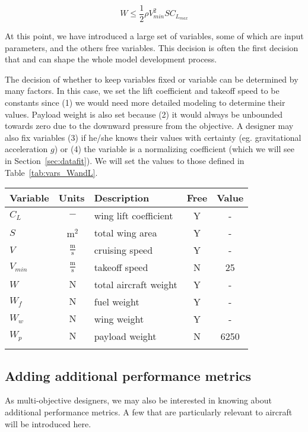 \begin{equation}
    W \leq \frac{1}{2} \rho V_{min}^2 S C_{L_{max}}
\end{equation}

At this point, we have introduced a large set of variables, some of which are input
parameters, and the others free variables. This decision is often the first decision
that
and can shape the whole model development process.

The decision of whether to keep variables fixed or variable can be determined by many
factors. In this case, we set the lift coefficient and takeoff speed to be constants since
(1) we would need
more detailed modeling to determine their values. Payload weight is also set
because (2) it would always be unbounded towards zero due to the downward pressure from
the objective. A designer may also fix variables (3) if he/she knows their values with
certainty (eg. gravitational acceleration $g$) or (4) the variable is a normalizing
coefficient (which we will see in Section~\ref{sec:datafit}). We will set the values
to those defined in Table~\ref{tab:vars_WandL}.

\footnotesize
\centering
\begin{tabular}{ l c l c c}
    \toprule
	Variable & Units & Description & Free & Value \\
    \midrule
    $C_L$ & $~\mathrm{-}$ & wing lift coefficient & Y & - \\
    $S$ & $~\mathrm{m^{2}}$ & total wing area & Y & - \\
    $V$ & $~\mathrm{\tfrac{m}{s}}$ & cruising speed & Y & - \\
    $V_{min}$ & $~\mathrm{\tfrac{m}{s}}$ & takeoff speed & N & 25 \\
    $W$ & $~\mathrm{N}$ & total aircraft weight & Y & -\\
    $W_f$ & $~\mathrm{N}$ & fuel weight & Y & -\\
    $W_w$ & $~\mathrm{N}$ & wing weight & Y & - \\
    $W_p$ & $~\mathrm{N}$ & payload weight & N & 6250\\
    \bottomrule
    \label{tab:vars_WandL}
\end{tabular}


\subsection{Adding additional performance metrics}

As multi-objective designers, we may also be interested in knowing about additional performance metrics. A
few that are particularly relevant to aircraft will be introduced here.

